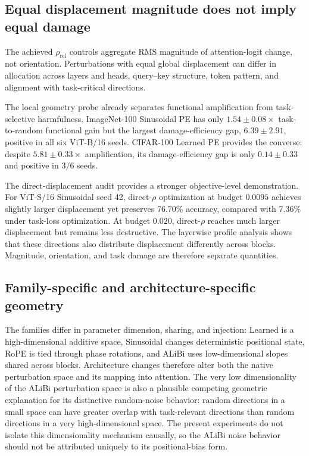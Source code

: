\documentclass[preprint,12pt,authoryear]{elsarticle}
\begin{document}
\subsection{Equal displacement magnitude does not imply equal damage}

The achieved $\rho_{\mathrm{rel}}$ controls aggregate RMS magnitude of
attention-logit change, not orientation. Perturbations with equal global
displacement can differ in allocation across layers and heads, query--key
structure, token pattern, and alignment with task-critical directions.

The local geometry probe already separates functional amplification from
task-selective harmfulness. ImageNet-100 Sinusoidal PE has only
$1.54\pm0.08\times$ task-to-random functional gain but the largest
damage-efficiency gap, $6.39\pm2.91$, positive in all six ViT-B/16
seeds. CIFAR-100 Learned PE provides the converse: despite
$5.81\pm0.33\times$ amplification, its damage-efficiency gap is only
$0.14\pm0.33$ and positive in $3/6$ seeds.

The direct-displacement audit provides a stronger objective-level
demonstration. For ViT-S/16
Sinusoidal seed 42, direct-$\rho$ optimization at budget $0.0095$
achieves slightly larger displacement yet preserves 76.70\% accuracy,
compared with 7.36\% under task-loss optimization. At budget $0.020$, direct-$\rho$ reaches much
larger displacement but remains less destructive. The layerwise profile
analysis shows that these directions also distribute displacement differently
across blocks.
Magnitude, orientation, and task damage are therefore separate quantities.

\subsection{Family-specific and architecture-specific geometry}

The families differ in parameter dimension, sharing, and injection:
Learned is a high-dimensional additive space, Sinusoidal changes
deterministic positional state, RoPE is tied through phase rotations, and
ALiBi uses low-dimensional slopes shared across blocks. Architecture changes
therefore alter both the native perturbation space and its mapping into
attention. The very low dimensionality of the ALiBi perturbation space is also
a plausible competing geometric explanation for its distinctive random-noise
behavior: random directions in a small space can have greater overlap with
task-relevant directions than random directions in a very high-dimensional
space. The present experiments do not isolate this dimensionality mechanism
causally, so the ALiBi noise behavior should not be attributed uniquely to its
positional-bias form.
\end{document}
